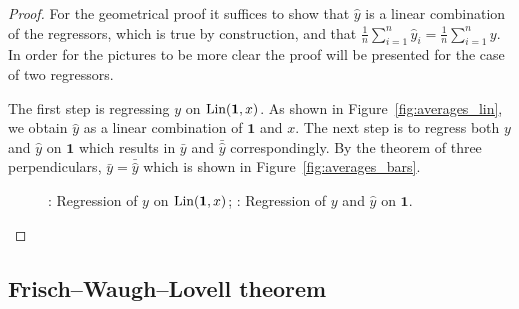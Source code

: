 \begin{proof}
For the geometrical proof it suffices to show that $\hat y$ is a linear combination of the regressors, which is true by construction,
and that $\frac{1}{n} \sum_{i=1}^{n} \hat y_i = \frac{1}{n} \sum_{i=1}^{n} y$. In order for the pictures to be more clear the proof will be presented for the case of two regressors.

The first step is regressing $y$ on $\operatorname{Lin}(\mathbf{1}, x)$. As shown in Figure~\ref{fig:averages_lin}, we obtain $\hat y$ as a linear combination of $\mathbf{1}$ and $x$.
The next step is to regress both $y$ and $\hat y$ on $\mathbf{1}$ which results in $\bar y$ and $\bar \hat y$ correspondingly.
By the theorem of three perpendiculars, $\bar y = \bar{\hat y}$ which is shown in Figure~\ref{fig:averages_bars}.

\begin{figure}[ht!]
\begin{center}
\hspace{4ex}
\caption{: Regression of $y$ on $\operatorname{Lin}(\mathbf{1},x)$;
: Regression of $y$ and $\hat y$ on $\mathbf{1}$.}
\end{center}
\end{figure}
\end{proof}


\subsection{Frisch–Waugh–Lovell theorem}

